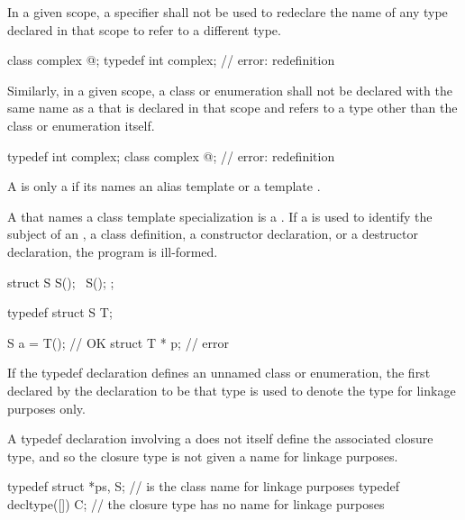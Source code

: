 \pnum
In a given scope, a  specifier shall not be used to
redeclare the name of any type declared in that scope to refer to a
different type.
\begin{example}
\begin{codeblock}
class complex { @\commentellip@ };
typedef int complex;            // error: redefinition
\end{codeblock}
\end{example}

\pnum
Similarly, in a given scope, a class or enumeration shall not be
declared with the same name as a  that is
declared in that scope and refers to a type other than the class or
enumeration itself.
\begin{example}
\begin{codeblock}
typedef int complex;
class complex { @\commentellip@ };    // error: redefinition
\end{codeblock}
\end{example}

\pnum
{}%
A  is only a 
if its  names
an alias template or a template .
\begin{note}
A  that names a class template specialization
is a .
If a  is used to identify the subject of an
, a class
definition, a constructor
declaration, or a destructor
declaration, the program is ill-formed.
\end{note}
\begin{example}
\begin{codeblock}
struct S {
  S();
  ~S();
};

typedef struct S T;

S a = T();                      // OK
struct T * p;                   // error
\end{codeblock}
\end{example}

\pnum
{}%
%
%
If the typedef declaration defines an unnamed class or enumeration, the first
 declared by the declaration to be that type
is used to denote the type for linkage purposes only.
\begin{note}
A typedef declaration involving a 
does not itself define the associated closure type,
and so the closure type is not given a name for linkage purposes.
\end{note}
\begin{example}
\begin{codeblock}
typedef struct { } *ps, S;      //  is the class name for linkage purposes
typedef decltype([]{}) C;       // the closure type has no name for linkage purposes
\end{codeblock}
\end{example}

